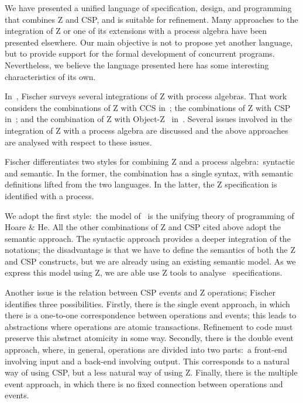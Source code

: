 \documentclass{article}
\begin{document}
We have presented a unified language of specification, design, and
programming that combines Z and CSP, and is suitable for refinement.
Many approaches to the integration of Z or one of its extensions with
a process algebra have been presented elsewhere.  Our main objective
is not to propose yet another language, but to provide support for the
formal development of concurrent programs.  Nevertheless, we believe
the language presented here has some interesting characteristics of
its own.

In~\cite{Fis98}, Fischer surveys several integrations of Z with
process algebras.  That work considers the combinations of Z with CCS
in~\cite{Gal96,TA97}; the combinations of Z with CSP
in~\cite{Fis97,RWW94}; and the combination of Z with
Object-Z~\cite{CDDKRS90} in~\cite{Fis97}.  Several issues involved in
the integration of Z with a process algebra are discussed and the
above approaches are analysed with respect to these issues.

Fischer differentiates two styles for combining Z and a process
algebra:~syntactic and semantic.  In the former, the combination has a
single syntax, with semantic definitions lifted from the two
languages.  In the latter, the Z specification is identified with a
process.

We adopt the first style:~the model of \Circus\ is the unifying theory
of programming of Hoare \& He.  All the other combinations of Z and
CSP cited above adopt the semantic approach.  The syntactic approach
provides a deeper integration of the notations; the disadvantage is
that we have to define the semantics of both the Z and CSP constructs,
but we are already using an existing semantic model.  As we express
this model using Z, we are able use Z tools to analyse \Circus\
specifications.

Another issue is the relation between CSP events and Z operations;
Fischer identifies three possibilities.  Firstly, there is the single
event approach, in which there is a one-to-one correspondence between
operations and events; this leads to abstractions where operations are
atomic transactions.  Refinement to code must preserve this abstract
atomicity in some way.  Secondly, there is the double event approach,
where, in general, operations are divided into two parts:~a front-end
involving input and a back-end involving output.  This corresponds to
a natural way of using CSP, but a less natural way of using Z.
Finally, there is the multiple event approach, in which there is no
fixed connection between operations and events.
\end{document}

